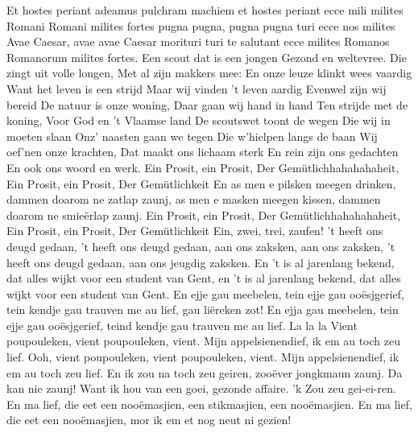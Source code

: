 \documentclass{article}
\begin{document}
\begin{songs}{}
\endverse
\beginverse*
Et hostes periant
adeamus pulchram machiem
et hostes periant
ecce mili milites Romani
Romani milites fortes
pugna pugna, pugna pugna turi
ecce nos milites
\endverse
\beginverse*
Avae Caesar, avae avae Caesar
morituri turi te salutant
ecce milites Romanos
Romanorum milites fortes.
\endverse
\endsong
{}
\beginverse
Een scout dat is een jongen
Gezond en weltevree.
Die zingt uit volle longen,
Met al zijn makkers mee:
\endverse
\beginchorus
En onze leuze klinkt wees vaardig
Want het leven is een strijd
Maar wij vinden ’t leven aardig 
Evenwel zijn wij bereid
\endchorus
\beginverse
De natuur is onze woning,
Daar gaan wij hand in hand
Ten strijde met de koning,
Voor God en ’t Vlaamse land
\endverse
\beginverse
De scoutswet toont de wegen
Die wij in moeten slaan
Onz’ naasten gaan we tegen
Die w’hielpen langs de baan
\endverse
\beginverse
Wij oef’nen onze krachten,
Dat maakt ons lichaam sterk
En rein zijn ons gedachten
En ook ons woord en werk.
\endverse
\endsong
{}
\beginverse*
Ein Prosit, ein Prosit,
Der Gemütlichhahahahaheit,
Ein Prosit, ein Prosit,
Der Gemütlichkeit
\endverse
\beginverse*
En as men e pilsken meegen drinken,
dammen doarom ne zatlap zaunj,
as men e masken meegen kissen,
dammen doarom ne smieërlap zaunj.
\endverse
\beginchorus
Ein Prosit, ein Prosit,
Der Gemütlichhahahahaheit,
Ein Prosit, ein Prosit,
Der Gemütlichkeit
\endchorus
\beginverse*
Ein, zwei, trei, zaufen!
\endverse
\beginverse*
 't heeft ons deugd gedaan,
't heeft ons deugd gedaan,
aan ons zaksken,
aan ons zaksken,
't heeft ons deugd gedaan,
aan ons jeugdig zaksken.
\endverse
\beginverse*
En 't is al jarenlang bekend,
dat alles wijkt voor een student van Gent,
en 't is al jarenlang bekend,
dat alles wijkt voor een student van Gent.
\endverse
\beginverse*
En ejje gau meebelen,
tein ejje gau ooësjgerief,
tein kendje gau trauven me au lief,
gau liëreken zot!
En ejja gau meebelen,
tein ejje gau ooësjgerief,
teind kendje gau trauven me au lief.
\endverse
\beginverse*
La la la
\endverse
\beginverse*
Vient poupouleken,
vient poupouleken, vient.
Mijn appelsienendief,
ik em au toch zeu lief.
Ooh, vient poupouleken,
vient poupouleken, vient.
Mijn appelsienendief,
ik em au toch zeu lief.
\endverse
\beginverse*
En ik zou na toch zeu geiren,
zooëver jongkmaun zaunj.
Da kan nie zaunj!
Want ik hou van een goei,
gezonde affaire.
'k Zou zeu gei-ei-ren.
\endverse
\beginverse*
En ma lief, die eet een nooëmasjien,
een stikmasjien, een nooëmasjien.
En ma lief, die eet een nooëmasjien,
mor ik em et nog neut ni gezien!
\endverse

\end{songs}
\end{document}
